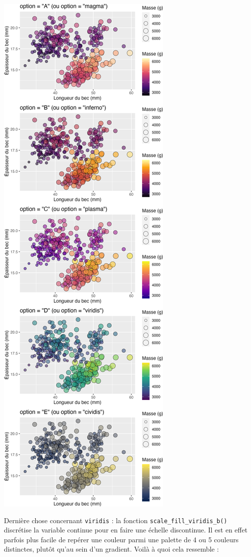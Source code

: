 \documentclass[
  letterpaper,
  DIV=11,
  numbers=noendperiod]{scrreprt}
\begin{document}
\includegraphics{./03-visualization_files/figure-pdf/unnamed-chunk-93-1.png}

Dernière chose concernant \texttt{viridis} : la fonction
\texttt{scale\_fill\_viridis\_b()} discrétise la variable continue pour
en faire une échelle discontinue. Il est en effet parfois plus facile de
repérer une couleur parmi une palette de 4 ou 5 couleurs distinctes,
plutôt qu'au sein d'un gradient. Voilà à quoi cela ressemble :
\end{document}
